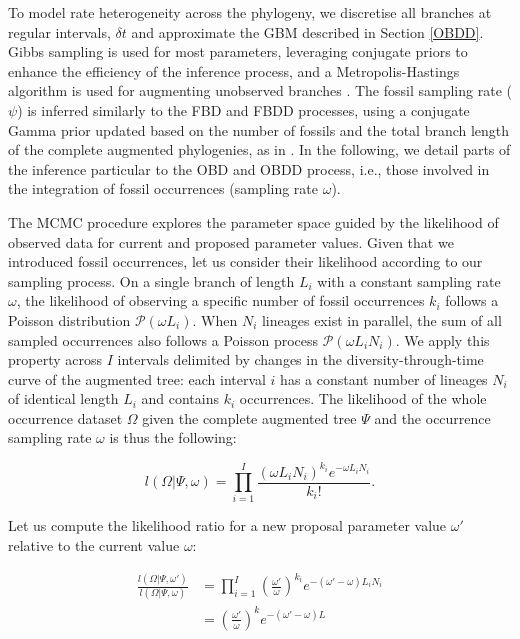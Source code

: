\documentclass[oupdraft]{sysbio}
\begin{document}
To model rate heterogeneity across the phylogeny, we discretise all branches at regular intervals, $\delta t$ and approximate the GBM described in Section \ref{OBDD}. Gibbs sampling is used for most parameters, leveraging conjugate priors to enhance the efficiency of the inference process, and a Metropolis-Hastings algorithm is used for augmenting unobserved branches \citep{quintero_imbalanced_2024, quintero_rise_2025}. The fossil sampling rate ($\psi$) is inferred similarly to the FBD and FBDD processes, using a conjugate Gamma prior updated based on the number of fossils and the total branch length of the complete augmented phylogenies, as in \citet{quintero_rise_2025}. In the following, we detail parts of the inference particular to the OBD and OBDD process, i.e., those involved in the integration of fossil occurrences (sampling rate $\omega$).

The MCMC procedure explores the parameter space guided by the likelihood of observed data for current and proposed parameter values. Given that we introduced fossil occurrences, let us consider their likelihood according to our sampling process. On a single branch of length $L_i$ with a constant sampling rate $\omega$, the likelihood of observing a specific number of fossil occurrences $k_i$ follows a Poisson distribution $\mathcal P(\omega L_i)$. When $N_i$ lineages exist in parallel, the sum of all sampled occurrences also follows a Poisson process $\mathcal P(\omega L_i N_i)$. We apply this property across $I$ intervals delimited by changes in the diversity-through-time curve of the augmented tree: each interval $i$ has a constant number of lineages $N_i$ of identical length $L_i$ and contains $k_i$ occurrences. The likelihood of the whole occurrence dataset $\Omega$ given the complete augmented tree $\Psi$ and the occurrence sampling rate $\omega$ is thus the following:

\begin{equation}\label{eq:ll_occ}
    l(\Omega|\Psi, \omega) = \prod_{i=1}^I \frac{(\omega L_i N_i)^{k_i}e^{-\omega L_i N_i}}{k_i!}.
\end{equation}

Let us compute the likelihood ratio for a new proposal parameter value $\omega'$ relative to the current value $\omega$:

\begin{align*}\label{eq:ll_ratio}
\frac{l(\Omega|\Psi, \omega')}{l(\Omega|\Psi, \omega)} &= \prod_{i=1}^I \left(\frac{\omega'}{\omega}\right)^{k_i}e^{-(\omega'-\omega) L_i N_i}\\
&= \left(\frac{\omega'}{\omega}\right)^{k}e^{-(\omega'-\omega) L}
\end{align*}
\end{document}
